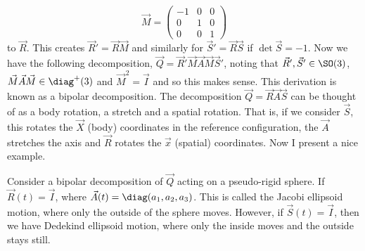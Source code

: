 $$ \vec M = \begin{pmatrix}
  -1 & 0 & 0 \\ 0 & 1 & 0 \\ 0 & 0 & 1
\end{pmatrix} $$
to $\vec R$. This creates $\vec R' = \vec R\vec M$ and similarly for $\vec S' = \vec R\vec S$ if $\det \vec S = -1$. Now we have the following decomposition, $\vec Q = \vec R'\vec M\vec A\vec M\vec S'$, noting that $\vec R', \vec S' \in \SO(3)$, $\vec M\vec A\vec M \in \diag^+(3)$ and
 $\vec M^2 = \vec I$ and so this makes sense. This derivation is known as a bipolar decomposition. The decomposition $\vec Q = \vec R\vec A\vec S$ can be thought of as a body rotation, a stretch and a spatial rotation. That is, if we consider $\vec S$, this rotates the $\vec X$ (body) coordinates in the reference configuration, the $\vec A$ stretches the axis and $\vec R$ rotates the $\vec x$ (spatial) coordinates. Now I present a nice example.

\begin{eg}
  Consider a bipolar decomposition of $\vec Q$ acting on a pseudo-rigid sphere. If $\vec R(t) = \vec I$, where $\vec A(t) = \diag (a_1, a_2, a_3)$. This is called the Jacobi ellipsoid motion, where only the outside of the sphere moves. However, if $\vec S(t) = \vec I$, then we have Dedekind ellipsoid motion, where only the inside moves and the outside stays still.

  \begin{figure}[!ht]
    \begin{minipage}{0.49\textwidth}
      \centering
      \resizebox{0.48\textwidth}{!}{}
    \end{minipage}\hspace{20pt}\begin{minipage}{0.49\textwidth}
    \centering
    \resizebox{0.48\textwidth}{!}{}
    \end{minipage}
  \end{figure}
\end{eg}

